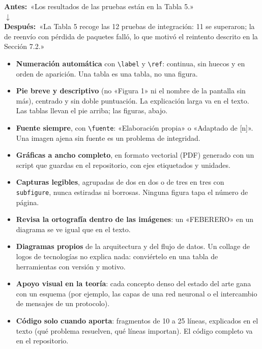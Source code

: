 \documentclass[11pt,a4paper]{article}
\newcommand{\cmd}[1]{\texttt{\textbackslash #1}}
\newcommand{\antes}[1]{\textcolor{BrickRed!80!black}{\textbf{Antes:}}~«#1»}
\newcommand{\despues}[1]{\textcolor{ForestGreen!80!black}{\textbf{Después:}}~«#1»}
\begin{document}
\begin{center}
  \antes{Los resultados de las pruebas están en la Tabla 5.}\\[2pt]
  $\downarrow$\\[2pt]
  \despues{La Tabla 5 recoge las 12 pruebas de integración: 11 se superaron; la
  de reenvío con pérdida de paquetes falló, lo que motivó el reintento descrito
  en la Sección 7.2.}
\end{center}

\begin{itemize}
  \item \textbf{Numeración automática} con \cmd{label} y \cmd{ref}: continua,
        sin huecos y en orden de aparición. Una tabla es una tabla, no una
        figura.
  \item \textbf{Pie breve y descriptivo} (no «Figura 1» ni el nombre de la
        pantalla sin más), centrado y sin doble puntuación. La explicación
        larga va en el texto. Las tablas llevan el pie arriba; las figuras,
        abajo.
  \item \textbf{Fuente siempre}, con \cmd{fuente}: «Elaboración propia» o
        «Adaptado de [n]». Una imagen ajena sin fuente es un problema de
        integridad.
  \item \textbf{Gráficas a ancho completo}, en formato vectorial (PDF) generado
        con un script que guardas en el repositorio, con ejes etiquetados y
        unidades.
  \item \textbf{Capturas legibles}, agrupadas de dos en dos o de tres en tres
        con \texttt{subfigure}, nunca estiradas ni borrosas. Ninguna figura
        tapa el número de página.
  \item \textbf{Revisa la ortografía dentro de las imágenes}: un «FEBERERO» en
        un diagrama se ve igual que en el texto.
  \item \textbf{Diagramas propios} de la arquitectura y del flujo de datos. Un
        collage de logos de tecnologías no explica nada: conviértelo en una
        tabla de herramientas con versión y motivo.
  \item \textbf{Apoyo visual en la teoría}: cada concepto denso del estado del
        arte gana con un esquema (por ejemplo, las capas de una red neuronal o
        el intercambio de mensajes de un protocolo).
  \item \textbf{Código solo cuando aporta}: fragmentos de 10 a 25 líneas,
        explicados en el texto (qué problema resuelven, qué líneas importan). El
        código completo va en el repositorio.
\end{itemize}
\end{document}
